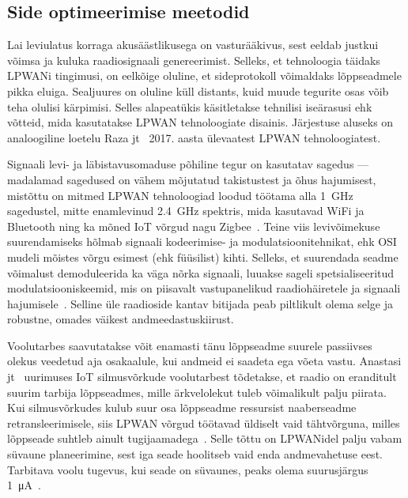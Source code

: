 \documentclass[12pt]{article}
\begin{document}
    \subsection{Side optimeerimise meetodid}

    Lai leviulatus korraga akusäästlikusega on vasturääkivus, sest eeldab justkui võimsa ja kuluka raadiosignaali genereerimist.
    Selleks, et tehnoloogia täidaks LPWANi tingimusi, on eelkõige oluline, et sideprotokoll võimaldaks lõppseadmele pikka eluiga.
    Sealjuures on oluline küll distants, kuid muude tegurite osas võib teha olulisi kärpimisi.
    Selles alapeatükis käsitletakse tehnilisi iseärasusi ehk võtteid, mida kasutatakse LPWAN tehnoloogiate disainis.
    Järjestuse aluseks on analoogiline loetelu Raza jt~\cite{raza} 2017. aasta ülevaatest LPWAN tehnoloogiatest.

    Signaali levi- ja läbistavusomaduse põhiline tegur on kasutatav sagedus — madalamad sagedused on vähem mõjutatud takistustest ja õhus hajumisest, mistõttu on mitmed LPWAN tehnoloogiad loodud töötama alla \SI{1}{\giga\hertz} sagedustel, mitte enamlevinud \SI{2,4}{\giga\hertz} spektris, mida kasutavad WiFi ja Bluetooth ning ka mõned IoT võrgud nagu Zigbee~\cite{bardyn}.
    Teine viis levivõimekuse suurendamiseks hõlmab signaali kodeerimise- ja modulatsioonitehnikat, ehk OSI mudeli mõistes võrgu esimest (ehk füüsilist) kihti. Selleks, et suurendada seadme võimalust demoduleerida ka väga nõrka signaali, luuakse sageli spetsialiseeritud modulatsiooniskeemid, mis on piisavalt vastupanelikud raadiohäiretele ja signaali hajumisele~\cite{reynders}.
    Selline üle raadioside kantav bitijada peab piltlikult olema selge ja robustne, omades väikest andmeedastuskiirust.

    Voolutarbes saavutatakse võit enamasti tänu lõppseadme suurele passiivses olekus veedetud aja osakaalule, kui andmeid ei saadeta ega võeta vastu.
    Anastasi jt~\cite{anastasi} uurimuses IoT silmusvõrkude voolutarbest tõdetakse, et raadio on eranditult suurim tarbija lõppseadmes, mille ärkvelolekut tuleb võimalikult palju piirata.
    Kui silmusvõrkudes kulub suur osa lõppseadme ressursist naaberseadme retransleerimisele, siis LPWAN võrgud töötavad üldiselt vaid tähtvõrguna, milles lõppseade suhtleb ainult tugijaamadega~\cite{centenaro}.
    Selle tõttu on LPWANidel palju vabam süvaune planeerimine, sest iga seade hoolitseb vaid enda andmevahetuse eest. Tarbitava voolu tugevus, kui seade on süvaunes, peaks olema suurusjärgus \SI{1}{\micro\ampere}~\cite{goursaud}.
\end{document}
